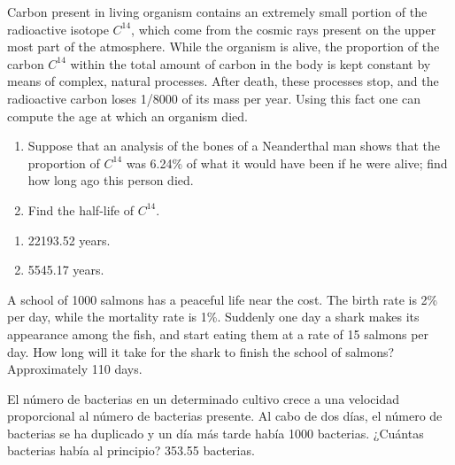 {Carbon present in living organism contains an extremely small portion of the radioactive isotope $C^{14}$, which come from the cosmic rays present on the upper most part of the atmosphere.
While the organism is alive, the proportion of the carbon $C^{14}$ within the total amount of carbon in the body is kept constant by means of complex, natural processes.
After death, these processes stop, and the radioactive carbon loses 1/8000 of its mass per year.
Using this fact one can compute the age at which an organism died.
\begin{enumerate}
\item Suppose that an analysis of the bones of a Neanderthal man shows that the proportion of $C^{14}$ was 6.24\% of what it would have been if he were alive; find how long ago this person died.
\item Find the half-life of $C^{14}$.
\end{enumerate}
}
{
\begin{enumerate}
\item 22193.52 years.
\item 5545.17 years.
\end{enumerate}
}
{}


{A school of 1000 salmons has a peaceful life near the cost.
The birth rate is 2\% per day, while the mortality rate is 1\%.
Suddenly one day a shark makes its appearance among the fish, and start eating them at a rate of 15 salmons per day.
How long will it take for the shark to finish the school of salmons?
}
{Approximately 110 days.
}
{}


{El número de bacterias en un determinado cultivo crece a una velocidad proporcional al número de bacterias presente.
Al cabo de dos días, el número de bacterias se ha duplicado y un día más tarde había 1000 bacterias.
¿Cuántas bacterias había al principio?
}
{353.55 bacterias.
}
{}
